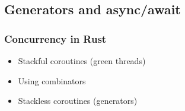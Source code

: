 \subsection{Generators and async/await} %
\begin{frame}[fragile]
    \frametitle{Concurrency in Rust}
% 
% 
% 
% 
    \begin{itemize}
        \item Stackful coroutines (green threads)
        \item Using combinators
        \item Stackless coroutines (generators)
    \end{itemize}
% 
\end{frame}



